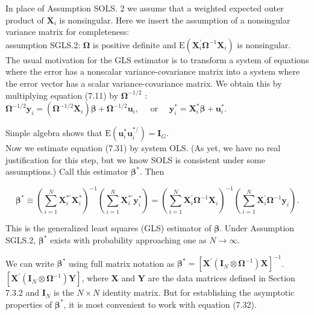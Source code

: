\documentclass[10pt]{article}
\begin{document}
In place of Assumption SOLS. 2 we assume that a weighted expected outer product of $\mathbf{X}_{i}$ is nonsingular. Here we insert the assumption of a nonsingular variance matrix for completeness:\\
assumption SGLS.2: $\boldsymbol{\Omega}$ is positive definite and $\mathrm{E}\left(\mathbf{X}_{i}^{\prime} \boldsymbol{\Omega}^{-1} \mathbf{X}_{i}\right)$ is nonsingular.\\
The usual motivation for the GLS estimator is to transform a system of equations where the error has a nonscalar variance-covariance matrix into a system where the error vector has a scalar variance-covariance matrix. We obtain this by multiplying equation (7.11) by $\boldsymbol{\Omega}^{-1 / 2}$ :\\
$\boldsymbol{\Omega}^{-1 / 2} \mathbf{y}_{i}=\left(\boldsymbol{\Omega}^{-1 / 2} \mathbf{X}_{i}\right) \boldsymbol{\beta}+\boldsymbol{\Omega}^{-1 / 2} \mathbf{u}_{i}, \quad$ or $\quad \mathbf{y}_{i}^{*}=\mathbf{X}_{i}^{*} \boldsymbol{\beta}+\mathbf{u}_{i}^{*}$.

Simple algebra shows that $\mathrm{E}\left(\mathbf{u}_{i}^{*} \mathbf{u}_{i}^{* /}\right)=\mathbf{I}_{G}$.\\
Now we estimate equation (7.31) by system OLS. (As yet, we have no real justification for this step, but we know SOLS is consistent under some assumptions.) Call this estimator $\boldsymbol{\beta}^{*}$. Then


\begin{equation*}
\boldsymbol{\beta}^{*} \equiv\left(\sum_{i=1}^{N} \mathbf{X}_{i}^{* \prime} \mathbf{X}_{i}^{*}\right)^{-1}\left(\sum_{i=1}^{N} \mathbf{X}_{i}^{* \prime} \mathbf{y}_{i}^{*}\right)=\left(\sum_{i=1}^{N} \mathbf{X}_{i}^{\prime} \boldsymbol{\Omega}^{-1} \mathbf{X}_{i}\right)^{-1}\left(\sum_{i=1}^{N} \mathbf{X}_{i}^{\prime} \boldsymbol{\Omega}^{-1} \mathbf{y}_{i}\right) . \tag{7.32}
\end{equation*}


This is the generalized least squares (GLS) estimator of $\boldsymbol{\beta}$. Under Assumption SGLS.2, $\boldsymbol{\beta}^{*}$ exists with probability approaching one as $N \rightarrow \infty$.

We can write $\boldsymbol{\beta}^{*}$ using full matrix notation as $\boldsymbol{\beta}^{*}=\left[\mathbf{X}^{\prime}\left(\mathbf{I}_{N} \otimes \boldsymbol{\Omega}^{-1}\right) \mathbf{X}\right]^{-1}$. $\left[\mathbf{X}^{\prime}\left(\mathbf{I}_{N} \otimes \boldsymbol{\Omega}^{-1}\right) \mathbf{Y}\right]$, where $\mathbf{X}$ and $\mathbf{Y}$ are the data matrices defined in Section 7.3.2 and $\mathbf{I}_{N}$ is the $N \times N$ identity matrix. But for establishing the asymptotic properties of $\boldsymbol{\beta}^{*}$, it is most convenient to work with equation (7.32).
\end{document}
